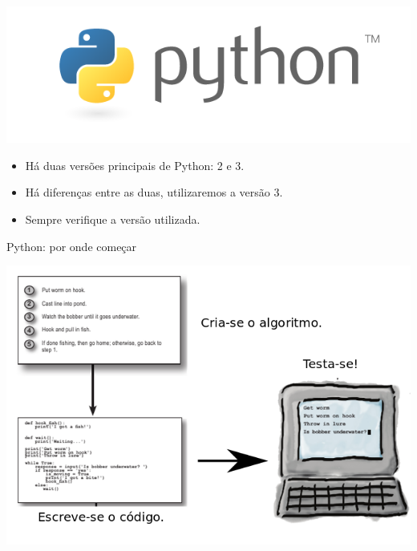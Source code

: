 \documentclass{beamer}
\begin{document}
\begin{frame}

\begin{center}
\includegraphics[scale=0.3]{./figures/python-logo.png}
\end{center}
  
  \begin{itemize}
   \vfill \item Há duas versões principais de Python: 2 e 3.
   
   \vfill \item Há diferenças entre as duas, utilizaremos a versão 3.
   
   \vfill \item Sempre verifique a versão utilizada.
   
  \end{itemize}
\end{frame}

\begin{frame}{Python: por onde começar}
 
 \includegraphics[scale=0.4]{./figures/fluxo.png}
 
\end{frame}
\end{document}
